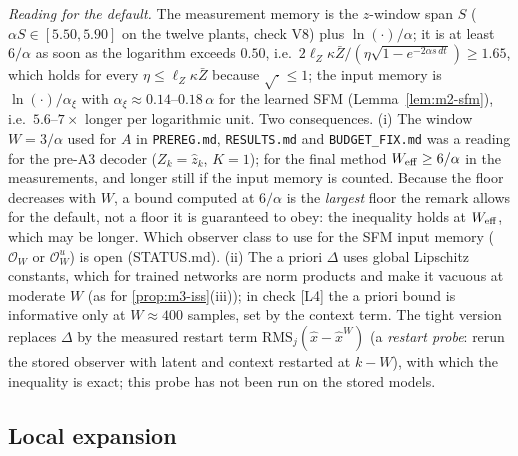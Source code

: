 \noindent\emph{Reading for the default.}  The measurement memory is the $z$-window
span $S$ ($\alpha S\in[5.50,5.90]$ on the twelve plants, check V8) plus $\ln(\cdot)/\alpha$; it is at least $6/\alpha$ as soon as
the logarithm exceeds $0.50$, i.e.\ $2\ell_Z\kappa\bar Z/(\eta\sqrt{1-e^{-2\alpha s\,dt}})\ge1.65$, which holds for every
$\eta\le\ell_Z\kappa\bar Z$ because $\sqrt{\cdot}\le1$; the input memory is $\ln(\cdot)/\alpha_\xi$ with $\alpha_\xi\approx0.14$--$0.18\,\alpha$ for
the learned SFM (Lemma~\ref{lem:m2-sfm}), i.e.\ $5.6$--$7\times$ longer per logarithmic unit. Two consequences.
(i) The window $W=3/\alpha$ used for $A$ in \texttt{PREREG.md}, \texttt{RESULTS.md} and \texttt{BUDGET\_FIX.md} was a
reading for the pre-A3 decoder ($Z_k=\hat z_k$, $K=1$); for the final method $W_{\rm eff}\ge6/\alpha$ in the
measurements, and longer still if the input memory is counted. Because the floor decreases with $W$, a bound computed at
$6/\alpha$ is the \emph{largest} floor the remark allows for the default, not a floor it is guaranteed to obey: the
inequality holds at $W_{\rm eff}$, which may be longer. Which observer class to use for the SFM input memory
($\mathcal O_W$ or $\mathcal O^u_W$) is open (STATUS.md). (ii) The a priori $\Delta$ uses global Lipschitz
constants, which for trained networks are norm products and make it vacuous at moderate $W$ (as for
\ref{prop:m3-iss}(iii)); in check [L4] the a priori bound is informative only at $W\approx400$ samples, set by the
context term. The tight version replaces $\Delta$ by the measured restart term
$\mathrm{RMS}_j(\hat x-\hat x^W)$ (a \emph{restart probe}: rerun the stored observer with latent and context restarted
at $k-W$), with which the inequality is exact; this probe has not been run on the stored models.

\subsection{Local expansion}

